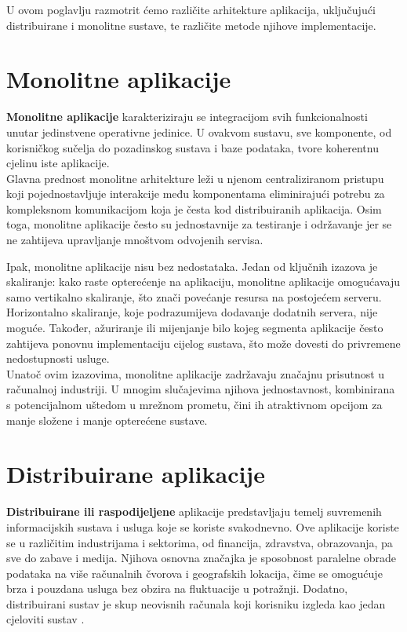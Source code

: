 \documentclass[times, utf8, diplomski]{fer}
\begin{document}
U ovom poglavlju razmotrit ćemo različite arhitekture aplikacija, uključujući distribuirane i monolitne sustave, te različite metode njihove implementacije.


\section{Monolitne aplikacije}
\label{sec:monolith}

\textbf{Monolitne aplikacije }karakteriziraju se integracijom svih funkcionalnosti unutar jedinstvene operativne jedinice. U ovakvom sustavu, sve komponente, od korisničkog sučelja do pozadinskog sustava i baze podataka, tvore koherentnu cjelinu iste aplikacije. \\

Glavna prednost monolitne arhitekture leži u njenom centraliziranom pristupu koji pojednostavljuje interakcije među komponentama eliminirajući potrebu za kompleksnom komunikacijom koja je česta kod distribuiranih aplikacija. Osim toga, monolitne aplikacije često su jednostavnije za testiranje i održavanje jer se ne zahtijeva upravljanje mnoštvom odvojenih servisa. 

Ipak, monolitne aplikacije nisu bez nedostataka. Jedan od ključnih izazova je skaliranje: kako raste opterećenje na aplikaciju, monolitne aplikacije omogućavaju samo vertikalno skaliranje, što znači povećanje resursa na postojećem serveru. Horizontalno skaliranje, koje podrazumijeva dodavanje dodatnih servera, nije moguće. Također, ažuriranje ili mijenjanje bilo kojeg segmenta aplikacije često zahtijeva ponovnu implementaciju  cijelog sustava, što može dovesti do privremene nedostupnosti usluge. \\

Unatoč ovim izazovima, monolitne aplikacije zadržavaju značajnu prisutnost u računalnoj industriji. U mnogim slučajevima njihova jednostavnost, kombinirana s potencijalnom uštedom u mrežnom prometu, čini ih atraktivnom opcijom za manje složene i manje opterećene sustave.


\section{Distribuirane aplikacije}
\label{sec:distributed}

\textbf{Distribuirane ili raspodijeljene} aplikacije predstavljaju temelj suvremenih informacijskih sustava i usluga koje se koriste svakodnevno. Ove aplikacije koriste se u različitim industrijama i sektorima, od financija, zdravstva, obrazovanja, pa sve do zabave i medija. Njihova osnovna značajka je sposobnost paralelne obrade podataka na više računalnih čvorova i geografskih lokacija, čime se omogućuje brza i pouzdana usluga bez obzira na fluktuacije u potražnji. Dodatno, distribuirani sustav je skup neovisnih računala koji korisniku izgleda kao jedan cjeloviti sustav \citep{tanenbaum_distributed_2007}.\\
\end{document}
